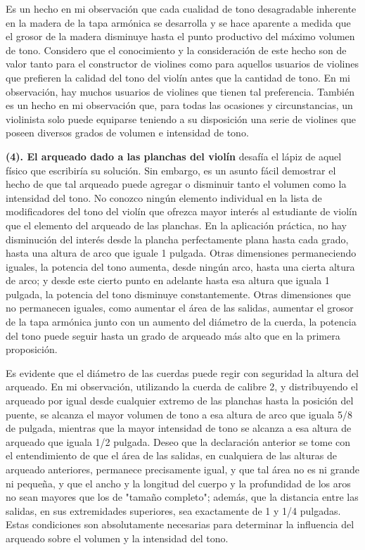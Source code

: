 \documentclass[12pt]{book}
\begin{document}
Es un hecho en mi observación que cada cualidad de tono desagradable inherente en la madera de la tapa armónica se desarrolla y se hace aparente a medida que el grosor de la madera disminuye hasta el punto productivo del máximo volumen de tono. Considero que el conocimiento y la consideración de este hecho son de valor tanto para el constructor de violines como para aquellos usuarios de violines que prefieren la calidad del tono del violín antes que la cantidad de tono. En mi observación, hay muchos usuarios de violines que tienen tal preferencia. También es un hecho en mi observación que, para todas las ocasiones y circunstancias, un violinista solo puede equiparse teniendo a su disposición una serie de violines que poseen diversos grados de volumen e intensidad de tono.

\textbf{(4). El arqueado dado a las planchas del violín} desafía el lápiz de aquel físico que escribiría su solución. Sin embargo, es un asunto fácil demostrar el hecho de que tal arqueado puede agregar o disminuir tanto el volumen como la intensidad del tono. No conozco ningún elemento individual en la lista de modificadores del tono del violín que ofrezca mayor interés al estudiante de violín que el elemento del arqueado de las planchas. En la aplicación práctica, no hay disminución del interés desde la plancha perfectamente plana hasta cada grado, hasta una altura de arco que iguale 1 pulgada. Otras dimensiones permaneciendo iguales, la potencia del tono aumenta, desde ningún arco, hasta una cierta altura de arco; y desde este cierto punto en adelante hasta esa altura que iguala 1 pulgada, la potencia del tono disminuye constantemente. Otras dimensiones que no permanecen iguales, como aumentar el área de las salidas, aumentar el grosor de la tapa armónica junto con un aumento del diámetro de la cuerda, la potencia del tono puede seguir hasta un grado de arqueado más alto que en la primera proposición.

Es evidente que el diámetro de las cuerdas puede regir con seguridad la altura del arqueado. En mi observación, utilizando la cuerda de calibre 2, y distribuyendo el arqueado por igual desde cualquier extremo de las planchas hasta la posición del puente, se alcanza el mayor volumen de tono a esa altura de arco que iguala 5/8 de pulgada, mientras que la mayor intensidad de tono se alcanza a esa altura de arqueado que iguala 1/2 pulgada. Deseo que la declaración anterior se tome con el entendimiento de que el área de las salidas, en cualquiera de las alturas de arqueado anteriores, permanece precisamente igual, y que tal área no es ni grande ni pequeña, y que el ancho y la longitud del cuerpo y la profundidad de los aros no sean mayores que los de "tamaño completo"; además, que la distancia entre las salidas, en sus extremidades superiores, sea exactamente de 1 y 1/4 pulgadas. Estas condiciones son absolutamente necesarias para determinar la influencia del arqueado sobre el volumen y la intensidad del tono.
\end{document}
